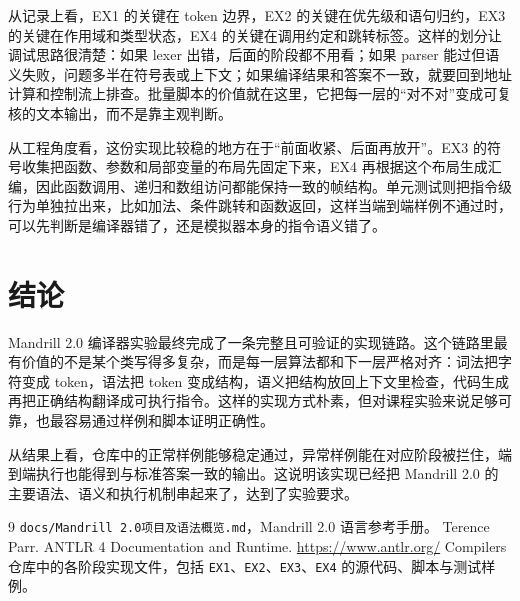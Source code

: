 \documentclass[UTF8,a4paper,12pt]{ctexart}
\begin{document}
从记录上看，EX1 的关键在 token 边界，EX2 的关键在优先级和语句归约，EX3 的关键在作用域和类型状态，EX4 的关键在调用约定和跳转标签。这样的划分让调试思路很清楚：如果 lexer 出错，后面的阶段都不用看；如果 parser 能过但语义失败，问题多半在符号表或上下文；如果编译结果和答案不一致，就要回到地址计算和控制流上排查。批量脚本的价值就在这里，它把每一层的“对不对”变成可复核的文本输出，而不是靠主观判断。

从工程角度看，这份实现比较稳的地方在于“前面收紧、后面再放开”。EX3 的符号收集把函数、参数和局部变量的布局先固定下来，EX4 再根据这个布局生成汇编，因此函数调用、递归和数组访问都能保持一致的帧结构。单元测试则把指令级行为单独拉出来，比如加法、条件跳转和函数返回，这样当端到端样例不通过时，可以先判断是编译器错了，还是模拟器本身的指令语义错了。

\section{结论}
Mandrill 2.0 编译器实验最终完成了一条完整且可验证的实现链路。这个链路里最有价值的不是某个类写得多复杂，而是每一层算法都和下一层严格对齐：词法把字符变成 token，语法把 token 变成结构，语义把结构放回上下文里检查，代码生成再把正确结构翻译成可执行指令。这样的实现方式朴素，但对课程实验来说足够可靠，也最容易通过样例和脚本证明正确性。

从结果上看，仓库中的正常样例能够稳定通过，异常样例能在对应阶段被拦住，端到端执行也能得到与标准答案一致的输出。这说明该实现已经把 Mandrill 2.0 的主要语法、语义和执行机制串起来了，达到了实验要求。

\begin{thebibliography}{9}
 \texttt{docs/Mandrill 2.0项目及语法概览.md}，Mandrill 2.0 语言参考手册。
 Terence Parr. ANTLR 4 Documentation and Runtime. \url{https://www.antlr.org/}
 Compilers 仓库中的各阶段实现文件，包括 \texttt{EX1}、\texttt{EX2}、\texttt{EX3}、\texttt{EX4} 的源代码、脚本与测试样例。
\end{thebibliography}
\end{document}
